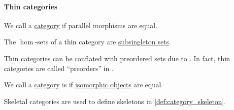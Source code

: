 \paragraph{Thin categories}

\begin{definition}\label{def:thin_category}
  We call a \hyperref[def:category]{category}  if parallel morphisms are equal.
\end{definition}
\begin{comments}
  \item The \( \hom \)-sets of a thin category are \hyperref[def:subsingleton_set]{subsingleton sets}.

  \item Thin categories can be conflated with preordered sets due to . In fact, thin categories are called \enquote{preorders} in \cite[11]{MacLane1998CategoryTheory}.
\end{comments}

\begin{definition}\label{def:skeletal_category}
  We call a \hyperref[def:category]{category} is  if \hyperref[def:morphism_invertibility/isomorphism]{isomorphic objects} are equal.
\end{definition}
\begin{comments}
  \item Skeletal categories are used to define skeletons in \cref{def:category_skeleton}.
\end{comments}

